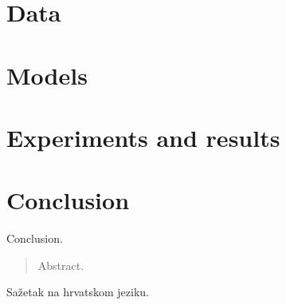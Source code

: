 \documentclass[times, utf8, zavrsni, english]{fer}
\begin{document}
\chapter{Data}

\chapter{Models}

\chapter{Experiments and results}

\chapter{Conclusion}
Conclusion.




\listoffigures
\begin{abstract}
Abstract.

\end{abstract}

\begin{sazetak}
Sažetak na hrvatskom jeziku.

\end{sazetak}
\end{document}
